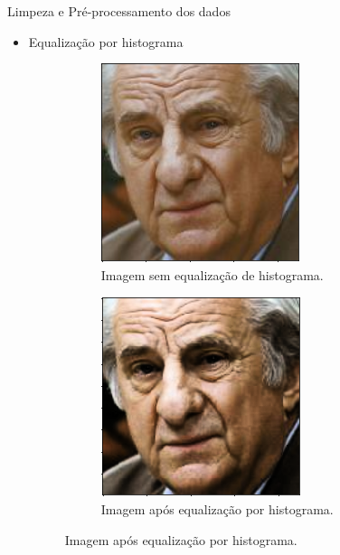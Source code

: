 \begin{frame}{Limpeza e Pré-processamento dos dados}
     \begin{itemize}
          \item Equalização por histograma
          \begin{figure}[!ht]
          	\centering
          	\begin{subfigure}[h]{0.4\linewidth}
          		\caption{Imagem sem equalização de histograma.}
          		\label{fig:eq_antes}
          		\centering
          		\includegraphics[width=0.8\linewidth]{img/solucao/hist_eq_orig.png}
          	\end{subfigure}
          	\hspace{0.1cm}
          	\begin{subfigure}[h]{0.4\linewidth}
          		\caption{Imagem após equalização por histograma.}
          		\label{fig:eq_depois}
          		\centering
          		\includegraphics[width=0.8\linewidth]{img/solucao/hist_eq_mod.png}

\end{subfigure}
\end{figure}
\end{itemize}
\end{frame}

